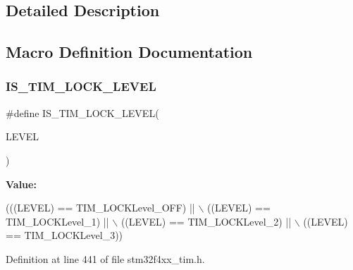 \subsection{Detailed Description}


\subsection{Macro Definition Documentation}
\mbox{\label{group___t_i_m___lock__level_gacf5e70717f6d13af301331bb043f5d48}} 
\subsubsection{\texorpdfstring{I\+S\+\_\+\+T\+I\+M\+\_\+\+L\+O\+C\+K\+\_\+\+L\+E\+V\+EL}{IS\_TIM\_LOCK\_LEVEL}}
{\footnotesize\ttfamily \#define I\+S\+\_\+\+T\+I\+M\+\_\+\+L\+O\+C\+K\+\_\+\+L\+E\+V\+EL(\begin{DoxyParamCaption}\item[{}]{L\+E\+V\+EL }\end{DoxyParamCaption})}

{\bfseries Value\+:}
\begin{DoxyCode}
(((LEVEL) == TIM\_LOCKLevel\_OFF) || \(\backslash\)
                                  ((LEVEL) == TIM\_LOCKLevel\_1) || \(\backslash\)
                                  ((LEVEL) == TIM\_LOCKLevel\_2) || \(\backslash\)
                                  ((LEVEL) == TIM\_LOCKLevel\_3))
\end{DoxyCode}


Definition at line 441 of file stm32f4xx\+\_\+tim.\+h.


